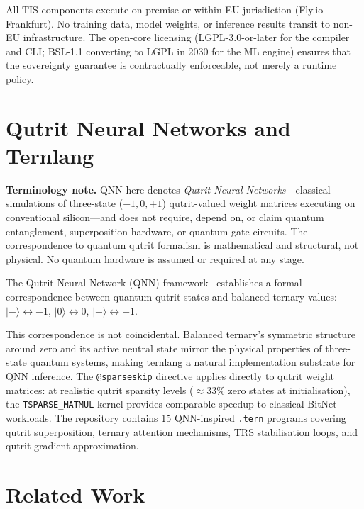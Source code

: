\documentclass[journal,10pt,twocolumn]{IEEEtran}
\begin{document}
All TIS components execute on-premise or within EU jurisdiction (Fly.io
Frankfurt). No training data, model weights, or inference results transit
to non-EU infrastructure. The open-core licensing (LGPL-3.0-or-later for
the compiler and CLI; BSL-1.1 converting to LGPL in 2030 for the ML engine)
ensures that the sovereignty guarantee is contractually enforceable, not
merely a runtime policy.

\section{Qutrit Neural Networks and Ternlang}
\label{sec:qnn}

\noindent\textbf{Terminology note.}
QNN here denotes \emph{Qutrit Neural Networks}---classical simulations of
three-state ($-1, 0, +1$) qutrit-valued weight matrices executing on
conventional silicon---and does not require, depend on, or claim quantum
entanglement, superposition hardware, or quantum gate circuits. The
correspondence to quantum qutrit formalism is mathematical and structural,
not physical. No quantum hardware is assumed or required at any stage.

The Qutrit Neural Network (QNN) framework~\cite{kepp2026qnn} establishes a
formal correspondence between quantum qutrit states and balanced ternary
values: $\lvert -\rangle \leftrightarrow -1$,\;
$\lvert 0\rangle \leftrightarrow 0$,\;
$\lvert +\rangle \leftrightarrow +1$.

This correspondence is not coincidental. Balanced ternary's symmetric
structure around zero and its active neutral state mirror the physical
properties of three-state quantum systems, making ternlang a natural
implementation substrate for QNN inference. The \texttt{@sparseskip}
directive applies directly to qutrit weight matrices: at realistic qutrit
sparsity levels ($\approx 33\%$ zero states at initialisation), the
\texttt{TSPARSE\_MATMUL} kernel provides comparable speedup to classical
BitNet workloads. The repository contains 15 QNN-inspired \texttt{.tern}
programs covering qutrit superposition, ternary attention mechanisms, TRS
stabilisation loops, and qutrit gradient approximation.

\section{Related Work}
\label{sec:related}
\end{document}
